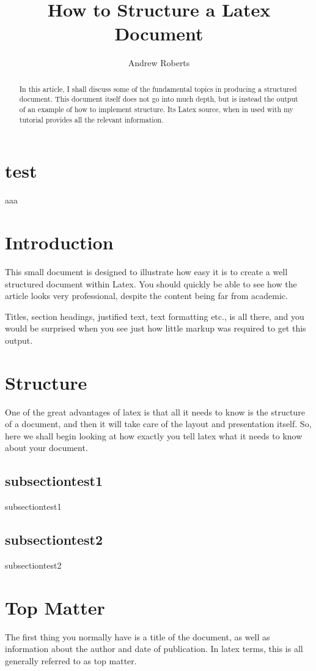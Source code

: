 
\title{How to Structure a Latex Document}
\author{Andrew Roberts}

	\begin{abstract}
		In this article, I shall discuss some of the fundamental topics in
		producing a structured document.  This document itself does not go into
		much depth, but is instead the output of an example of how to implement
		structure. Its Latex source, when in used with my tutorial
		provides all the relevant information.
	\end{abstract}

	\section{test}
	aaa

	\section{Introduction}
	This small document is designed to illustrate how easy it is to create a
	well structured document within Latex.  You should quickly be able to
	see how the article looks very professional, despite the content being
	far from academic.



	Titles, section headings, justified text, text
	formatting etc., is all there, and you would be surprised when you see
	just how little markup was required to get this output.


	\section{Structure}
	One of the great advantages of latex is that all it needs to know is
	the structure of a document, and then it will take care of the layout
	and presentation itself.  So, here we shall begin looking at how exactly
	you tell latex what it needs to know about your document.

	\subsection{subsectiontest1}
	subsectiontest1

	\subsection{subsectiontest2}
	subsectiontest2


	\section{Top Matter}
	The first thing you normally have is a title of the document, as well as
	information about the author and date of publication. In latex terms,
	this is all generally referred to as top matter.

